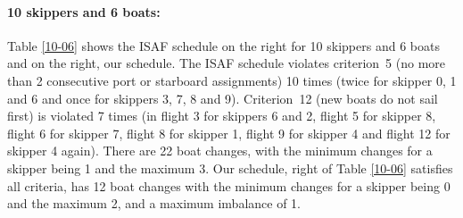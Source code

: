 \documentclass{llncs}
\begin{document}
\paragraph{10 skippers and 6 boats:} Table \ref{10-06} shows the ISAF schedule on the right for 10
skippers and 6 boats and on the right, our schedule.  The ISAF schedule violates criterion~5 (no more
than 2 consecutive port or starboard assignments) 10 times (twice for skipper 0, 1 and 6 and once
for skippers 3, 7, 8 and 9).  Criterion~12 (new boats do not sail first) is violated 7 times (in
flight 3 for skippers 6 and 2, flight 5 for skipper 8, flight 6 for skipper 7, flight 8 for skipper
1, flight 9 for skipper 4 and flight 12 for skipper 4 again). There are 22 boat changes, with the
minimum changes for a skipper being 1 and the maximum 3. Our schedule, right of Table \ref{10-06}
satisfies all criteria, has 12 boat changes with the minimum changes for a skipper being 0 and the
maximum 2, and a maximum imbalance of 1.
\end{document}
